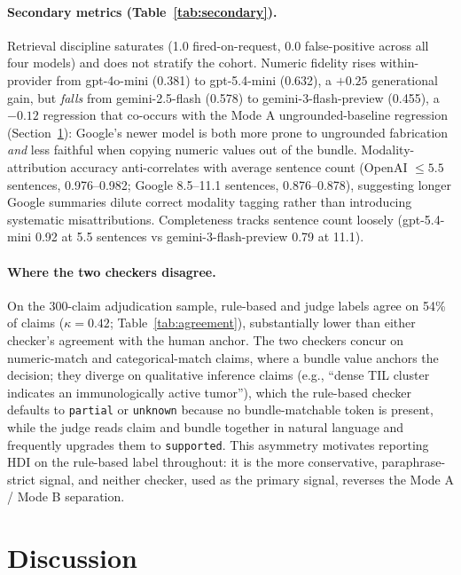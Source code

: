 \documentclass[11pt]{article}
\begin{document}
\paragraph{Secondary metrics (Table~\ref{tab:secondary}).}
Retrieval discipline saturates (1.0 fired-on-request, 0.0 false-positive across all four models) and does not stratify the cohort. Numeric fidelity rises within-provider from gpt-4o-mini (0.381) to gpt-5.4-mini (0.632), a $+0.25$ generational gain, but \emph{falls} from gemini-2.5-flash (0.578) to gemini-3-flash-preview (0.455), a $-0.12$ regression that co-occurs with the Mode A ungrounded-baseline regression (Section~\ref{sec:discussion}): Google's newer model is both more prone to ungrounded fabrication \emph{and} less faithful when copying numeric values out of the bundle. Modality-attribution accuracy anti-correlates with average sentence count (OpenAI $\leq 5.5$ sentences, 0.976--0.982; Google 8.5--11.1 sentences, 0.876--0.878), suggesting longer Google summaries dilute correct modality tagging rather than introducing systematic misattributions. Completeness tracks sentence count loosely (gpt-5.4-mini 0.92 at 5.5 sentences vs gemini-3-flash-preview 0.79 at 11.1).

\paragraph{Where the two checkers disagree.}
On the 300-claim adjudication sample, rule-based and judge labels agree on 54\% of claims ($\kappa{=}0.42$; Table~\ref{tab:agreement}), substantially lower than either checker's agreement with the human anchor. The two checkers concur on numeric-match and categorical-match claims, where a bundle value anchors the decision; they diverge on qualitative inference claims (e.g., ``dense TIL cluster indicates an immunologically active tumor''), which the rule-based checker defaults to \texttt{partial} or \texttt{unknown} because no bundle-matchable token is present, while the judge reads claim and bundle together in natural language and frequently upgrades them to \texttt{supported}. This asymmetry motivates reporting HDI on the rule-based label throughout: it is the more conservative, paraphrase-strict signal, and neither checker, used as the primary signal, reverses the Mode A / Mode B separation.


\section{Discussion}
\label{sec:discussion}
\end{document}
